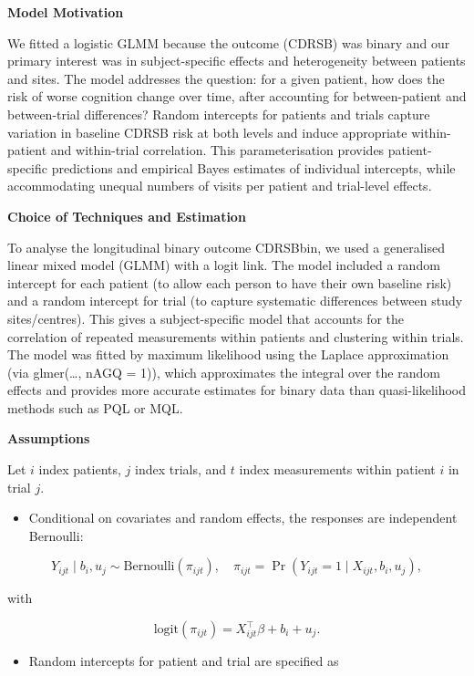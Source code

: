 \documentclass[
  11pt,
  letterpaper,
  DIV=11,
  numbers=noendperiod]{scrartcl}
\providecommand{\tightlist}{%
  \setlength{\itemsep}{0pt}\setlength{\parskip}{0pt}}\usepackage{longtable,booktabs,array}
\begin{document}
\textbf{Model Motivation}

We fitted a logistic GLMM because the outcome (CDRSB) was binary and our
primary interest was in subject-specific effects and heterogeneity
between patients and sites. The model addresses the question: for a
given patient, how does the risk of worse cognition change over time,
after accounting for between-patient and between-trial differences?
Random intercepts for patients and trials capture variation in baseline
CDRSB risk at both levels and induce appropriate within-patient and
within-trial correlation. This parameterisation provides
patient-specific predictions and empirical Bayes estimates of individual
intercepts, while accommodating unequal numbers of visits per patient
and trial-level effects.

\textbf{Choice of Techniques and Estimation}

To analyse the longitudinal binary outcome CDRSBbin, we used a
generalised linear mixed model (GLMM) with a logit link. The model
included a random intercept for each patient (to allow each person to
have their own baseline risk) and a random intercept for trial (to
capture systematic differences between study sites/centres). This gives
a subject-specific model that accounts for the correlation of repeated
measurements within patients and clustering within trials. The model was
fitted by maximum likelihood using the Laplace approximation (via
glmer(\ldots, nAGQ = 1)), which approximates the integral over the
random effects and provides more accurate estimates for binary data than
quasi-likelihood methods such as PQL or MQL.

\textbf{Assumptions}

Let \(i\) index patients, \(j\) index trials, and \(t\) index
measurements within patient \(i\) in trial \(j\).

\begin{itemize}
\tightlist
\item
  Conditional on covariates and random effects, the responses are
  independent Bernoulli:
\end{itemize}

\[
Y_{ijt} \mid b_i, u_j \sim \mathrm{Bernoulli}(\pi_{ijt}),
\quad 
\pi_{ijt} = \Pr(Y_{ijt} = 1 \mid X_{ijt}, b_i, u_j),
\]

with

\[
\mathrm{logit}(\pi_{ijt}) = X_{ijt}^\top \beta + b_i + u_j.
\]

\begin{itemize}
\tightlist
\item
  Random intercepts for patient and trial are specified as
\end{itemize}
\end{document}
